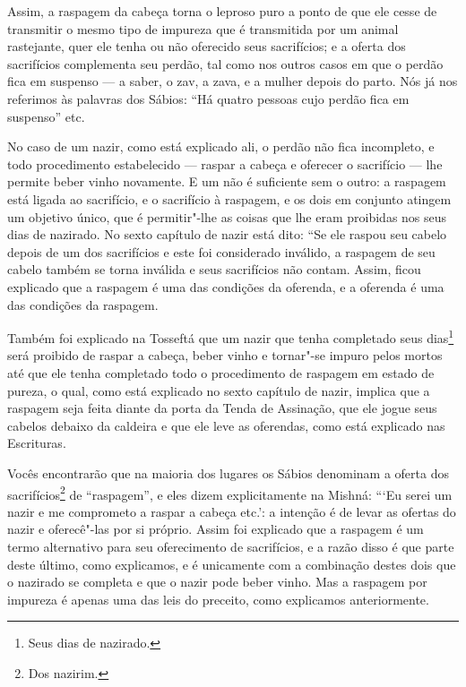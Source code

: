 \begin{multicols}{2}
Assim, a raspagem da cabeça torna o leproso puro a ponto de que ele
cesse de transmitir o mesmo tipo de impureza que é transmitida por um
animal rastejante, quer ele tenha ou não oferecido seus sacrifícios; e a
oferta dos sacrifícios complementa seu perdão, tal como nos outros casos
em que o perdão fica em suspenso --- a saber, o zav\starr, a zava\starr, e a
mulher depois do parto. Nós já nos referimos às palavras dos Sábios:
``Há quatro pessoas cujo perdão fica em suspenso'' etc.

No caso de um nazir\starr, como está explicado ali, o perdão não fica
incompleto, e todo procedimento estabelecido --- raspar a cabeça e
oferecer o sacrifício --- lhe permite beber vinho novamente. E um não é
suficiente sem o outro: a raspagem está ligada ao sacrifício, e o
sacrifício à raspagem, e os dois em conjunto atingem um objetivo único,
que é permitir"-lhe as coisas que lhe eram proibidas nos seus dias de
nazirado\starr. No sexto capítulo de nazir\starr{} está dito: ``Se ele raspou seu
cabelo depois de um dos sacrifícios e este foi considerado inválido, a
raspagem de seu cabelo também se torna inválida e seus sacrifícios não
contam. Assim, ficou explicado que a raspagem é uma das condições da
oferenda, e a oferenda é uma das condições da raspagem.

Também foi explicado na Tosseftá\starr{} que um nazir\starr{} que tenha completado seus dias\footnote{Seus dias de nazirado\starr.} será proibido de raspar a cabeça,
beber vinho e tornar"-se impuro pelos mortos até que ele tenha completado todo o procedimento de raspagem em estado de pureza, o qual, como está explicado no sexto capítulo de nazir\starr, implica que a raspagem seja feita diante da porta da Tenda de
Assinação, que ele jogue seus cabelos debaixo da caldeira e que ele
leve as oferendas, como está explicado nas Escrituras.

Vocês encontrarão que na maioria dos lugares os Sábios denominam
a oferta dos sacrifícios\footnote{Dos nazirim\starr.} de ``raspagem'', e eles
dizem explicitamente na Mishná\starr: ```Eu serei um nazir\starr{} e me comprometo a
raspar a cabeça etc.': a intenção é de levar as ofertas do nazir\starr{} e
oferecê"-las por si próprio. Assim foi explicado que a raspagem é um
termo alternativo para seu oferecimento de sacrifícios, e a razão disso
é que parte deste último, como explicamos, e é unicamente com a
combinação destes dois que o nazirado\starr{} se completa e que o nazir\starr{} pode
beber vinho. Mas a raspagem por impureza é apenas uma das leis do
preceito, como explicamos anteriormente.


\end{multicols}
